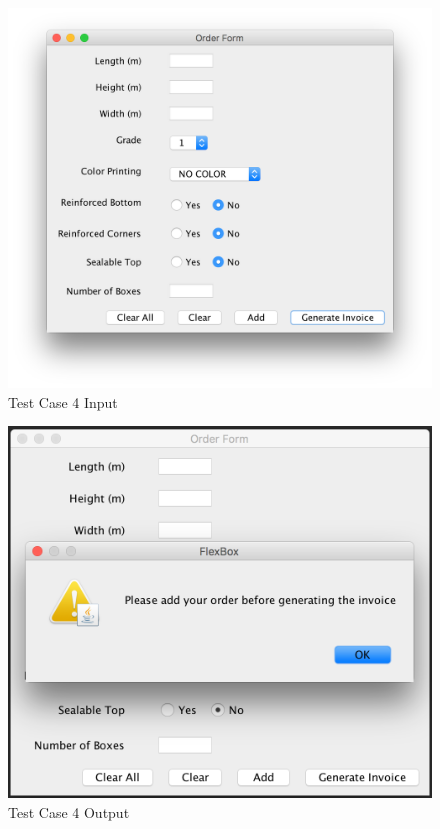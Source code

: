 \documentclass[12pt]{article}
\begin{document}
\begin{figure}[H]
	\includegraphics[width=\linewidth]{./screenshots/test_case_4_input.png}
	\caption{Test Case 4 Input}
	\label{test_case_4_input}
\end{figure}
\begin{figure}[H]
	\includegraphics[width=\linewidth]{./screenshots/test_case_4_output.png}
	\caption{Test Case 4 Output}
	\label{test_case_4_output}
\end{figure}
\end{document}
